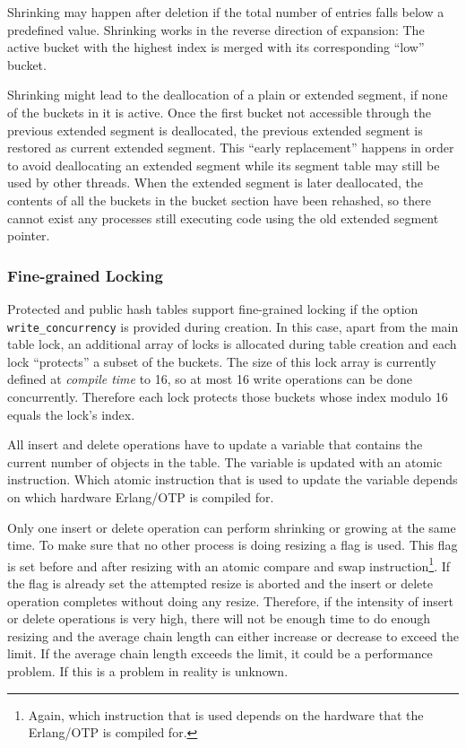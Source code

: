 \documentclass[aps,pre,preprint,nofootinbib]{revtex4}
\begin{document}
Shrinking may happen after deletion if the total number of entries falls below a predefined value.
Shrinking works in the reverse direction of expansion:
The active bucket with the highest index is merged with its corresponding ``low'' bucket.

Shrinking might lead to the deallocation of a plain or extended segment, if none of the buckets in it is active.
Once the first bucket not accessible through the previous extended segment is deallocated, the previous extended segment is restored as current extended segment.
This ``early replacement'' happens in order to avoid deallocating an extended segment while its segment table may still be used by other threads.
When the extended segment is later deallocated, the contents of all the buckets in the bucket section have been rehashed, so there cannot exist any processes still executing code using the old extended segment pointer.

\subsubsection{Fine-grained Locking}\label{sec:hash_fine_locking}

Protected and public hash tables support fine-grained locking if the option \verb|write_concurrency| is provided during creation.
In this case, apart from the main table lock, an additional array of locks is allocated during table creation and each lock ``protects'' a subset of the buckets.
The size of this lock array is currently defined at \emph{compile time} to 16, so at most 16 write operations can be done concurrently.
Therefore each lock protects those buckets whose index modulo 16 equals the lock's index.

All insert and delete operations have to update a variable that contains the current number of objects in the table.
The variable is updated with an atomic instruction.
Which atomic instruction that is used to update the variable depends on which hardware Erlang/OTP is compiled for.

Only one insert or delete operation can perform shrinking or growing at the same time.
To make sure that no other process is doing resizing a flag is used. 
This flag is set before and after resizing with an atomic compare and swap instruction\footnote{Again, which instruction that is used depends on the hardware that the Erlang/OTP is compiled for.}.
If the flag is already set the attempted resize is aborted and the insert or delete operation completes without doing any resize.
Therefore, if the intensity of insert or delete operations is very high, there will not be enough time to do enough resizing and the average chain length can either increase or decrease to exceed the limit.
If the average chain length exceeds the limit, it could be a performance problem.
If this is a problem in reality is unknown.
\end{document}
